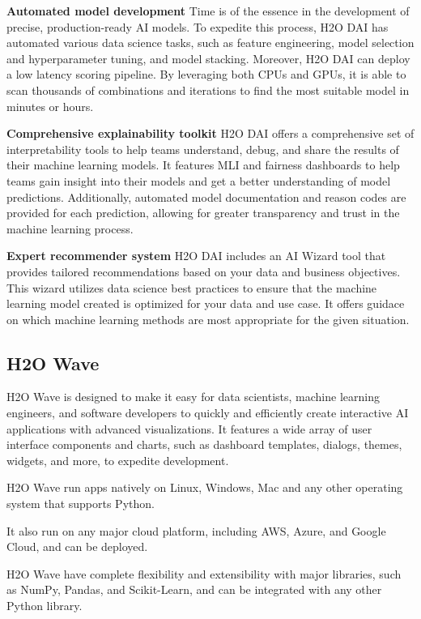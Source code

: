 \documentclass[12pt,a4paper]{report}
\begin{document}
\textbf{Automated model development} Time is of the essence in the development of precise, production-ready AI models. To expedite this 
process, H2O \ac{DAI} has automated various data science tasks, such as feature engineering, 
model selection and hyperparameter tuning, and model stacking. Moreover, H2O \ac{DAI} can deploy
a low latency scoring pipeline. By leveraging both CPUs and GPUs, it is able to scan 
thousands of combinations and iterations to find the most suitable model in minutes or hours.

\textbf{Comprehensive explainability toolkit} H2O \ac{DAI} offers a comprehensive set of 
interpretability tools to help teams understand, debug, and share the results of their machine 
learning models. It features \ac{MLI} and fairness dashboards 
to help teams gain insight into their models and get a better understanding of model predictions. 
Additionally, automated model documentation and reason codes are provided for each prediction, 
allowing for greater transparency and trust in the machine learning process.

\textbf{Expert recommender system} H2O \ac{DAI} includes an AI Wizard tool that provides tailored recommendations based on your 
data and business objectives. This wizard utilizes data science best practices to ensure that 
the machine learning model created is optimized for your data and use case. It offers guidace 
on which machine learning methods are most appropriate for the given situation.

\clearpage
\subsection{H2O Wave}

H2O Wave is designed to make it easy for data scientists, machine learning engineers, 
and software developers to quickly and efficiently create interactive AI applications 
with advanced visualizations. It features a wide array of user interface components 
and charts, such as dashboard templates, dialogs, themes, widgets, and more, to expedite development.

H2O Wave run apps natively on Linux, Windows, Mac and any other operating system that supports Python.

It also run on any major cloud platform, including AWS, Azure, and Google Cloud, and can be deployed.

H2O Wave have complete flexibility and extensibility with major libraries, such as NumPy, Pandas,
and Scikit-Learn, and can be integrated with any other Python library.
\end{document}
